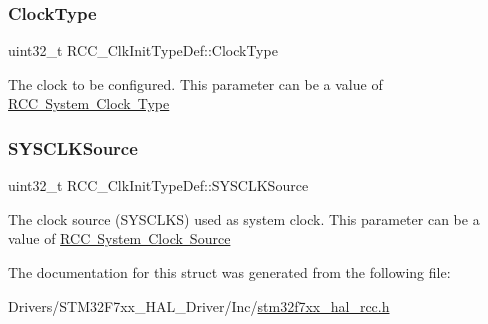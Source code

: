 \subsubsection{\texorpdfstring{ClockType}{ClockType}}
{\footnotesize\ttfamily uint32\+\_\+t R\+C\+C\+\_\+\+Clk\+Init\+Type\+Def\+::\+Clock\+Type}

The clock to be configured. This parameter can be a value of \mbox{\hyperlink{group___r_c_c___system___clock___type}{R\+CC System Clock Type}} \mbox{\label{struct_r_c_c___clk_init_type_def_a4ceff1fdbf423e347c63052ca2c1d7e1}} 
\subsubsection{\texorpdfstring{SYSCLKSource}{SYSCLKSource}}
{\footnotesize\ttfamily uint32\+\_\+t R\+C\+C\+\_\+\+Clk\+Init\+Type\+Def\+::\+S\+Y\+S\+C\+L\+K\+Source}

The clock source (S\+Y\+S\+C\+L\+KS) used as system clock. This parameter can be a value of \mbox{\hyperlink{group___r_c_c___system___clock___source}{R\+CC System Clock Source}} 

The documentation for this struct was generated from the following file\+:\begin{DoxyCompactItemize}
\item 
Drivers/\+S\+T\+M32\+F7xx\+\_\+\+H\+A\+L\+\_\+\+Driver/\+Inc/\mbox{\hyperlink{stm32f7xx__hal__rcc_8h}{stm32f7xx\+\_\+hal\+\_\+rcc.\+h}}\end{DoxyCompactItemize}
